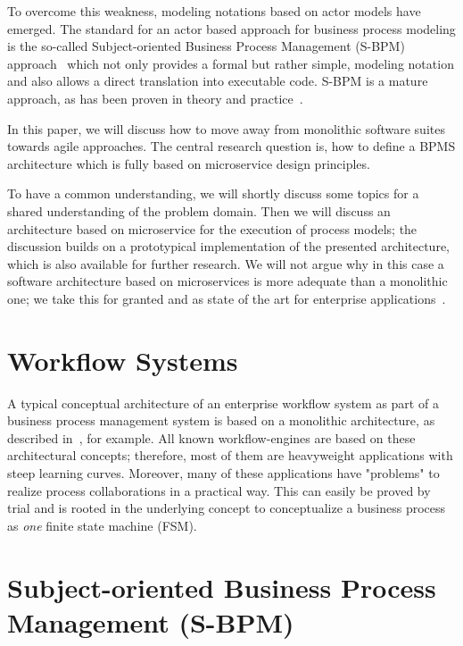 \documentclass[conference]{IEEEtran}
\newcommand{\citep}{\cite}
\begin{document}
To overcome this weakness, modeling notations based on actor models have emerged. The standard for an actor based approach for business process modeling is the so-called Subject-oriented Business Process Management (S-BPM) approach~\citep{Fleischmann:2012va} which not only provides a formal but rather simple, modeling notation and also allows a direct translation into executable code. S-BPM is a mature approach, as has been proven in theory and practice~\citep{Fleischmann:1994wf}\citep{Fleischmann:2012va}\citep{Fleischmann:2013vm}\citep{Fleischmann:2015}. 

In this paper, we will discuss how to move away from monolithic software suites towards agile approaches. The central research question is, how to define a BPMS architecture which is fully based on microservice design principles.

To have a common understanding, we will shortly discuss some topics for a shared understanding of the problem domain. Then we will discuss an architecture based on microservice for the execution of process models; the discussion builds on a prototypical implementation of the presented architecture, which is also available for further research. We will not argue why in this case a software architecture based on microservices is more adequate than a monolithic one; we take this for granted and as state of the art for enterprise applications~\cite{Amundsen:2016}\cite{Newman:2015ye}.

\section{Workflow Systems}
\label{traditionalworkflowsystem}	

A typical conceptual architecture of an enterprise workflow system as part of a business process management system is based on a monolithic architecture, as described in~\citep{Hollingsworth:1994}, for example. All known workflow-engines are based on these architectural concepts; therefore, most of them are heavyweight applications with steep learning curves. Moreover, many of these applications have "problems" to realize process collaborations in a practical way. This can easily be proved by trial and is rooted in the underlying concept to conceptualize a business process as \textit{one} finite state machine (FSM).

\section{Subject-oriented Business Process Management (S-BPM)} 
\end{document}
